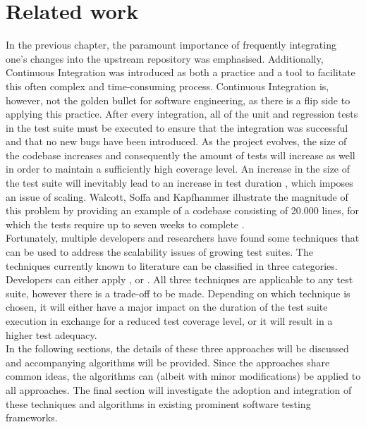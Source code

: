 
\chapter{Related work}
In the previous chapter, the paramount importance of frequently integrating one's changes into the upstream repository was emphasised. Additionally, Continuous Integration was introduced as both a practice and a tool to facilitate this often complex and time-consuming process. Continuous Integration is, however, not the golden bullet for software engineering, as there is a flip side to applying this practice. After every integration, all of the unit and regression tests in the test suite must be executed to ensure that the integration was successful and that no new bugs have been introduced. As the project evolves, the size of the codebase increases and consequently the amount of tests will increase as well in order to maintain a sufficiently high coverage level. An increase in the size of the test suite will inevitably lead to an increase in test duration \cite{evaluationoftestsuiteminimization}, which imposes an issue of scaling. Walcott, Soffa and Kapfhammer illustrate the magnitude of this problem by providing an example of a codebase consisting of 20.000 lines, for which the tests require up to seven weeks to complete \cite{10.1145/1146238.1146240}.\\

\noindent Fortunately, multiple developers and researchers have found some techniques that can be used to address the scalability issues of growing test suites. The techniques currently known to literature can be classified in three categories. Developers can either apply \emph{\tsm{}}, \emph{\tcs{}} or \emph{\tcp{}} \cite{evaluationoftestsuiteminimization}. All three techniques are applicable to any test suite, however there is a trade-off to be made. Depending on which technique is chosen, it will either have a major impact on the duration of the test suite execution in exchange for a reduced test coverage level, or it will result in a higher test adequacy.\\

\noindent In the following sections, the details of these three approaches will be discussed and accompanying algorithms will be provided. Since the approaches share common ideas, the algorithms can (albeit with minor modifications) be applied to all approaches. The final section will investigate the adoption and integration of these techniques and algorithms in existing prominent software testing frameworks.


\newpage

\newpage
